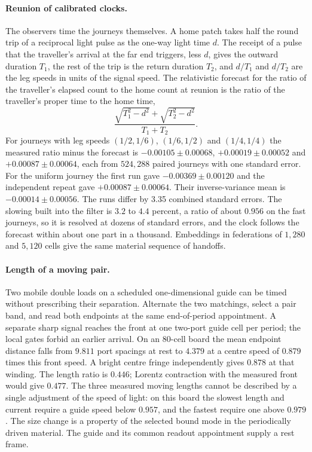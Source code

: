 \documentclass[11pt]{article}
\theoremstyle{definition}
\theoremstyle{remark}
\theoremstyle{plain}
\begin{document}
\paragraph{Reunion of calibrated clocks.}
The observers time the journeys themselves. A home patch takes half the
round trip of a reciprocal light pulse as the one-way light time $d$. The
receipt of a pulse that the traveller's arrival at the far end triggers,
less $d$, gives the outward duration $T_1$, the rest of the trip is the
return duration $T_2$, and $d/T_1$ and $d/T_2$ are the leg speeds in units
of the signal speed. The relativistic forecast for the ratio of the
traveller's elapsed count to the home count at reunion is the ratio of the
traveller's proper time to the home time,
\begin{equation}
\frac{\sqrt{T_1^{2}-d^{2}}+\sqrt{T_2^{2}-d^{2}}}{T_1+T_2}.
\label{eq:echo-forecast}
\end{equation}
For journeys with leg speeds $(1/2,1/6)$, $(1/6,1/2)$ and $(1/4,1/4)$ the
measured ratio minus the forecast is $-0.00105\pm0.00068$,
$+0.00019\pm0.00052$ and $+0.00087\pm0.00064$, each from $524{,}288$
paired journeys with one standard error. For the uniform journey the first run gave $-0.00369\pm0.00120$ and the independent repeat gave $+0.00087\pm0.00064$. Their inverse-variance mean is $-0.00014\pm0.00056$. The runs differ by 3.35 combined standard errors. The slowing built into the filter is $3.2$
to $4.4$ percent, a ratio of about $0.956$ on the fast journeys, so it is
resolved at dozens of standard errors, and the clock follows the forecast
within about one part in a thousand. Embeddings in federations of
$1{,}280$ and $5{,}120$ cells give the same material sequence of handoffs.

\paragraph{Length of a moving pair.}
Two mobile double loads on a scheduled one-dimensional guide can be
timed without prescribing their separation. Alternate the two
matchings, select a pair band, and read both endpoints at the same
end-of-period appointment. A separate sharp signal reaches the front
at one two-port guide cell per period; the local gates forbid an earlier
arrival. On an 80-cell board the mean endpoint distance falls from
$9.811$ port spacings at rest to $4.379$ at a centre speed of
$0.879$ times this front speed. A bright centre fringe independently
gives $0.878$ at that winding. The length ratio is $0.446$; Lorentz
contraction with the measured front would give $0.477$. The three
measured moving lengths cannot be described by a single adjustment
of the speed of light: on this board the slowest length and current
require a guide speed below $0.957$, and the fastest require one
above $0.979$. The size change is a property of the selected bound
mode in the periodically driven material. The guide and its common
readout appointment supply a rest frame.
\end{document}
